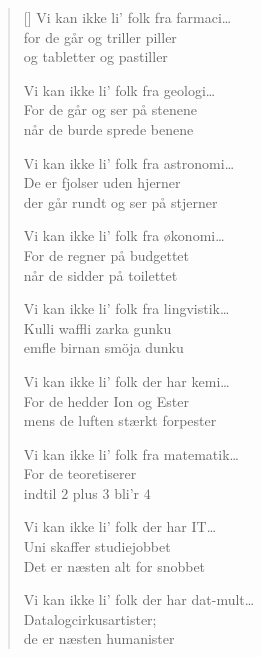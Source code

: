 {\begin{multicols}{3}
\begin{verse}[\versewidth]
Vi kan ikke li' folk fra farmaci\ldots\\
for de går og triller piller\\
og tabletter og pastiller

Vi kan ikke li' folk fra geologi\ldots\\
For de går og ser på stenene\\
når de burde sprede benene

Vi kan ikke li' folk fra astronomi\ldots\\
De er fjolser uden hjerner\\
der går rundt og ser på stjerner


Vi kan ikke li' folk fra økonomi\ldots\\
For de regner på budgettet\\
når de sidder på toilettet

Vi kan ikke li' folk fra lingvistik\ldots\\
Kulli waffli zarka gunku\\
emfle birnan smöja dunku

Vi kan ikke li' folk der har kemi\ldots\\
For de hedder Ion og Ester\\
mens de luften stærkt forpester

Vi kan ikke li' folk fra matematik\ldots\\
For de teoretiserer\\
indtil $2$ plus $3$ bli'r $4$
\columnbreak

Vi kan ikke li' folk der har IT\ldots\\
Uni skaffer studiejobbet\\
Det er næsten alt for snobbet

Vi kan ikke li' folk der har dat-mult\ldots\\
Datalogcirkusartister;\\
de er næsten humanister




\end{verse}
\end{multicols}}

